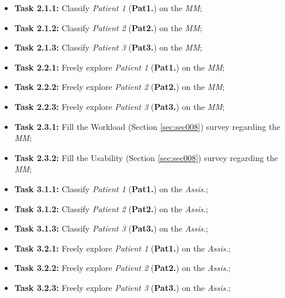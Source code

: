 \hfill

\begin{itemize}
\item[] \textbf{Task 2.1.1:} Classify \textit{Patient 1} ({\bf Pat1.}) on the \textit{MM};
\item[] \textbf{Task 2.1.2:} Classify \textit{Patient 2} ({\bf Pat2.}) on the \textit{MM};
\item[] \textbf{Task 2.1.3:} Classify \textit{Patient 3} ({\bf Pat3.}) on the \textit{MM};
\end{itemize}

\hfill

\begin{itemize}
\item[] \textbf{Task 2.2.1:} Freely explore \textit{Patient 1} ({\bf Pat1.}) on the \textit{MM};
\item[] \textbf{Task 2.2.2:} Freely explore \textit{Patient 2} ({\bf Pat2.}) on the \textit{MM};
\item[] \textbf{Task 2.2.3:} Freely explore \textit{Patient 3} ({\bf Pat3.}) on the \textit{MM};
\end{itemize}

\hfill

\begin{itemize}
\item[] \textbf{Task 2.3.1:} Fill the Workload (Section \ref{sec:sec008}) survey regarding the \textit{MM};
\item[] \textbf{Task 2.3.2:} Fill the Usability (Section \ref{sec:sec008}) survey regarding the \textit{MM};
\end{itemize}

\hfill

\begin{itemize}
\item[] \textbf{Task 3.1.1:} Classify \textit{Patient 1} ({\bf Pat1.}) on the \textit{Assis.};
\item[] \textbf{Task 3.1.2:} Classify \textit{Patient 2} ({\bf Pat2.}) on the \textit{Assis.};
\item[] \textbf{Task 3.1.3:} Classify \textit{Patient 3} ({\bf Pat3.}) on the \textit{Assis.};
\end{itemize}

\hfill

\begin{itemize}
\item[] \textbf{Task 3.2.1:} Freely explore \textit{Patient 1} ({\bf Pat1.}) on the \textit{Assis.};
\item[] \textbf{Task 3.2.2:} Freely explore \textit{Patient 2} ({\bf Pat2.}) on the \textit{Assis.};
\item[] \textbf{Task 3.2.3:} Freely explore \textit{Patient 3} ({\bf Pat3.}) on the \textit{Assis.};
\end{itemize}

